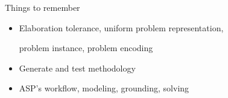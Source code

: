 \begin{frame}{Things to remember}
  \bigskip
  \begin{itemize}
  \item Elaboration tolerance, uniform problem representation,

    problem instance, problem encoding
    \smallskip
  \item Generate and test methodology
    \smallskip
  \item ASP's workflow, modeling, grounding, solving
  \end{itemize}
\end{frame}
%
